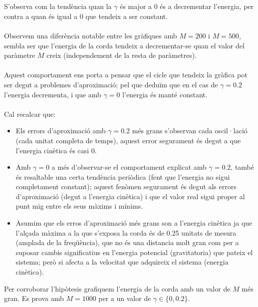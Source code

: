 \documentclass[a4paper, 11pt]{article}
\begin{document}
\\\\
S'observa com la tendència quan la $\gamma$ és major a 0 és a decrementar l'energia, per contra a quan és igual a 0 que tendeix a ser constant.\\\\
Observem una diferència notable entre les gràfiques amb $M = 200$ i $M = 500$, sembla ser que l'energia de la corda tendeix a decrementar-se quan el valor del paràmetre $M$ creix (independement de la resta de paràmetres).\\\\
Aquest comportament ens porta a pensar que el cicle que tendeix la gràfica pot ser degut a problemes d'aproximació; pel que deduïm que en el cas de $\gamma = 0.2$ l'energia decrementa, i que amb $\gamma = 0$ l'energia és manté constant.\\\\
Cal recalcar que:
\begin{itemize}
    \item Els errors d'aproximació amb $\gamma = 0.2$ més grans s'observan cada oscil·lació (cada unitat completa de temps), aquest error segurament és degut a que l'energia cinètica és casi 0.
    \item Amb $\gamma = 0$ a més d'observar-se el comportament explicat amb $\gamma = 0.2$, també és resaltable una certa tendència periòdica (fent que l'energia no sigui completament constant); aquest fenòmen segurament és degut als errors d'aproximació (degut a l'energia cinètica) i que el valor real sigui proper al punt mig entre els seus màxims i mínims.
    \item Asumim que els erros d'aproximació més grans son a l'energia cinètica ja que l'alçada màxima a la que s'exposa la corda és de 0.25 unitats de mesura (amplada de la freqüència), que no és una distancia molt gran com per a suposar cambis significatius en l'energia potencial (gravitatoria) que pateix el sistema; però si afecta a la velocitat que adquireix el sistema (energia cinètica).
\end{itemize}
Per corroborar l'hipòtesis grafiquem l'energia de la corda amb un valor de $M$ més gran. Es prova amb $ M = 1000$ per a un valor de $\gamma \in \{0, 0.2\}$.
\end{document}
